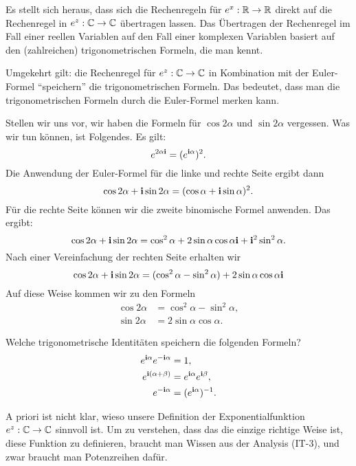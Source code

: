 \begin{bem}
	Es stellt sich heraus, dass sich die Rechenregeln für $e^x : \mathbb{R}\to \mathbb{R}$ direkt auf die Rechenregel in $e^z : \mathbb{C} \to \mathbb{C}$ übertragen lassen. Das Übertragen der Rechenregel im Fall einer reellen Variablen auf den Fall einer komplexen Variablen basiert auf den (zahlreichen) trigonometrischen Formeln, die man kennt. 
	
	Umgekehrt gilt: die Rechenregel für $e^z : \mathbb{C} \to \mathbb{C}$ in Kombination mit der Euler-Formel ``speichern'' die trigonometrischen Formeln. Das bedeutet, dass man die trigonometrischen Formeln durch die Euler-Formel merken kann. 
	
	Stellen wir uns vor, wir haben die Formeln für $\cos 2 \alpha$ und $\sin 2 \alpha$ vergessen. Was wir tun können, ist Folgendes. Es gilt: 
	\[
			e^{2 \alpha \mathbf{i}} = (e^{\mathbf{i} \alpha} )^2. 
	\]
	Die Anwendung der Euler-Formel für die linke und rechte Seite ergibt dann 
	\[
		\cos 2 \alpha + \mathbf{i} \sin 2 \alpha  = (\cos \alpha + \mathbf{i} \sin \alpha)^2. 
	\]
	Für die rechte Seite können wir die zweite binomische Formel anwenden. Das ergibt: 
	\[
		\cos 2 \alpha + \mathbf{i} \sin 2 \alpha  = \cos^2 \alpha + 2\sin \alpha \cos \alpha  \mathbf{i} + \mathbf{i}^2 \sin^2 \alpha. 
	\]
	Nach einer Vereinfachung der rechten Seite erhalten wir 
	\[
	\cos 2 \alpha + \mathbf{i} \sin 2 \alpha  = (\cos^2 \alpha - \sin^2 \alpha ) + 2\sin \alpha \cos \alpha \mathbf{i}
\]
Auf diese Weise kommen wir zu den Formeln
\begin{align*}
		\cos 2 \alpha  & = \cos^2 \alpha - \sin^2 \alpha, 
		\\ \sin 2 \alpha & = 2 \sin \alpha \cos \alpha. 
\end{align*} 
\end{bem} 

\begin{aufg} 
	Welche trigonometrische Identitäten speichern die folgenden Formeln? 
	\begin{align*}
			e^{\mathbf{i} \alpha} e^{- \mathbf{i} \alpha} & =1, 
			\\ e^{\mathbf{i} (\alpha + \beta)} & = e^{\mathbf{i} \alpha} e^{\mathbf{i} \beta},
			\\ e^{- \mathbf{i} \alpha} & = (e^{\mathbf{i} \alpha})^{-1}. 
	\end{align*} 
\end{aufg} 

\begin{bem}
	A priori ist nicht klar, wieso unsere Definition der Exponentialfunktion $e^z : \mathbb{C} \to \mathbb{C}$ sinnvoll ist. Um zu verstehen, dass das die einzige richtige Weise ist, diese Funktion zu definieren, braucht man Wissen aus der Analysis (IT-3), und zwar braucht  man Potenzreihen dafür. 
\end{bem} 

